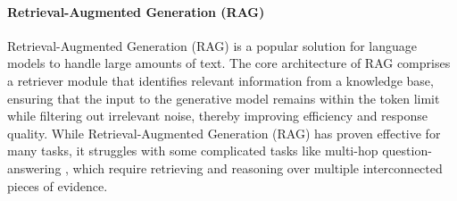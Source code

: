 \paragraph{Retrieval-Augmented Generation (RAG)}
Retrieval-Augmented Generation (RAG) \cite{DBLP:journals/corr/abs-2005-11401} is a popular solution for language models to handle large amounts of text. The core architecture of RAG comprises a retriever module that identifies relevant information from a knowledge base, ensuring that the input to the generative model remains within the token limit while filtering out irrelevant noise, thereby improving efficiency and response quality.
While Retrieval-Augmented Generation (RAG) has proven effective for many tasks, it struggles with some complicated tasks like multi-hop question-answering \cite{mavi2024multihopquestionanswering}, which require retrieving and reasoning over multiple interconnected pieces of evidence.
%